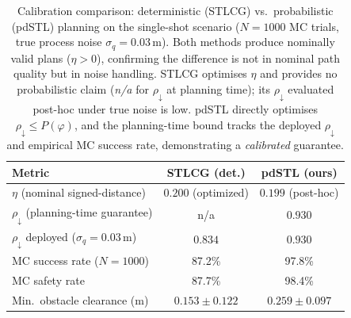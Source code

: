 \begin{table}[t]
  \centering
  \caption{%
    Calibration comparison: deterministic (STLCG) vs.\ probabilistic (pdSTL)
    planning on the single-shot scenario ($N=1000$ MC trials,
    true process noise $\sigma_q = 0.03$\,m).
    Both methods produce nominally valid plans ($\eta > 0$), confirming the
    difference is not in nominal path quality but in noise handling.
    STLCG optimises $\eta$ and provides no probabilistic claim
    (\emph{n/a} for $\rho_{\downarrow}$ at planning time); its
    $\rho_{\downarrow}$ evaluated post-hoc under true noise is low.
    pdSTL directly optimises $\rho_{\downarrow} \leq P(\varphi)$,
    and the planning-time bound tracks the deployed $\rho_{\downarrow}$
    and empirical MC success rate, demonstrating a \emph{calibrated} guarantee.
  }
  \label{tab:single_shot_comparison}
  \begin{tabular}{lcc}
    \toprule
    \textbf{Metric} & \textbf{STLCG (det.)} & \textbf{pdSTL (ours)} \\
    \midrule
    $\eta$ (nominal signed-distance) & $0.200$ (optimized) & $0.199$ (post-hoc) \\
    $\rho_{\downarrow}$ (planning-time guarantee) & n/a & $0.930$ \\
    $\rho_{\downarrow}$ deployed ($\sigma_q{=}0.03$\,m) & $0.834$ & $0.930$ \\
    MC success rate ($N=1000$) & 87.2\% & 97.8\% \\
    MC safety rate & 87.7\% & 98.4\% \\
    Min.~obstacle clearance (m) & $0.153 \pm 0.122$ & $0.259 \pm 0.097$ \\
    \bottomrule
  \end{tabular}
\end{table}
